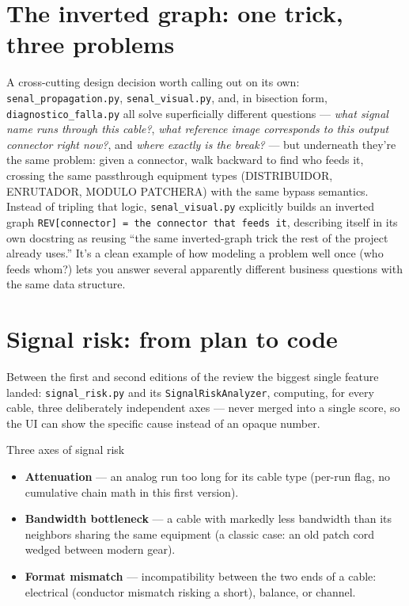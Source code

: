 \documentclass[10.4pt,twocolumn]{article}
\begin{document}
\section{The inverted graph: one trick, three problems}

A cross-cutting design decision worth calling out on its own: \texttt{senal\_propagation.py}, \texttt{senal\_visual.py}, and, in bisection form, \texttt{diagnostico\_falla.py} all solve superficially different questions --- \emph{what signal name runs through this cable?}, \emph{what reference image corresponds to this output connector right now?}, and \emph{where exactly is the break?} --- but underneath they're the same problem: given a connector, walk backward to find who feeds it, crossing the same passthrough equipment types (DISTRIBUIDOR, ENRUTADOR, MODULO PATCHERA) with the same bypass semantics. Instead of tripling that logic, \texttt{senal\_visual.py} explicitly builds an inverted graph \texttt{REV[connector] = the connector that feeds it}, describing itself in its own docstring as reusing ``the same inverted-graph trick the rest of the project already uses.'' It's a clean example of how modeling a problem well once (who feeds whom?) lets you answer several apparently different business questions with the same data structure.

\section{Signal risk: from plan to code}

Between the first and second editions of the review the biggest single feature landed: \texttt{signal\_risk.py} and its \texttt{SignalRiskAnalyzer}, computing, for every cable, three deliberately independent axes --- never merged into a single score, so the UI can show the specific cause instead of an opaque number.

\begin{specbox}{Three axes of signal risk}
\begin{itemize}[leftmargin=1.0em,itemsep=2pt,topsep=2pt]
\item \textbf{Attenuation} --- an analog run too long for its cable type (per-run flag, no cumulative chain math in this first version).
\item \textbf{Bandwidth bottleneck} --- a cable with markedly less bandwidth than its neighbors sharing the same equipment (a classic case: an old patch cord wedged between modern gear).
\item \textbf{Format mismatch} --- incompatibility between the two ends of a cable: electrical (conductor mismatch risking a short), balance, or channel.
\end{itemize}
\end{specbox}
\end{document}
